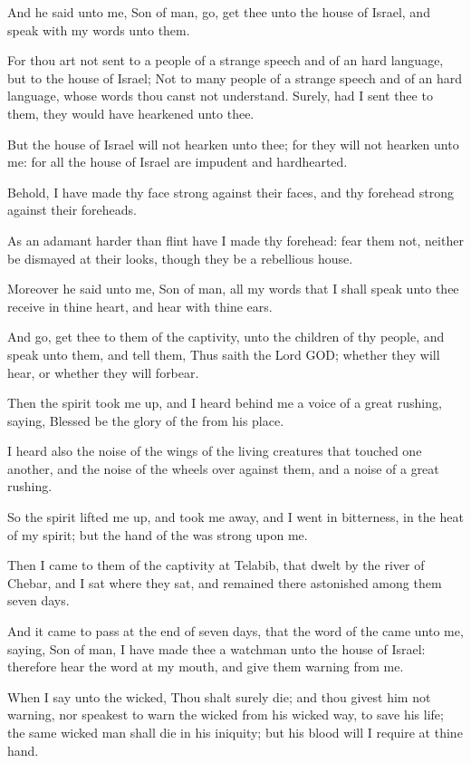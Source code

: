 \Verse And he said unto me, Son of man, go, get thee unto the house of Israel, and speak with my words unto them.

\Verse For thou art not sent to a people of a strange speech and of an hard language, but to the house of Israel; \Verse Not to many people of a strange speech and of an hard language, whose words thou canst not understand. Surely, had I sent thee to them, they would have hearkened unto thee.

\Verse But the house of Israel will not hearken unto thee; for they will not hearken unto me: for all the house of Israel are impudent and hardhearted.

\Verse Behold, I have made thy face strong against their faces, and thy forehead strong against their foreheads.

\Verse As an adamant harder than flint have I made thy forehead: fear them not, neither be dismayed at their looks, though they be a rebellious house.

\Verse Moreover he said unto me, Son of man, all my words that I shall speak unto thee receive in thine heart, and hear with thine ears.

\Verse And go, get thee to them of the captivity, unto the children of thy people, and speak unto them, and tell them, Thus saith the Lord GOD; whether they will hear, or whether they will forbear.

\Verse Then the spirit took me up, and I heard behind me a voice of a great rushing, saying, Blessed be the glory of the \LORD from his place.

\Verse I heard also the noise of the wings of the living creatures that touched one another, and the noise of the wheels over against them, and a noise of a great rushing.

\Verse So the spirit lifted me up, and took me away, and I went in bitterness, in the heat of my spirit; but the hand of the \LORD was strong upon me.

\Verse Then I came to them of the captivity at Telabib, that dwelt by the river of Chebar, and I sat where they sat, and remained there astonished among them seven days.

\Verse And it came to pass at the end of seven days, that the word of the \LORD came unto me, saying, \Verse Son of man, I have made thee a watchman unto the house of Israel: therefore hear the word at my mouth, and give them warning from me.

\Verse When I say unto the wicked, Thou shalt surely die; and thou givest him not warning, nor speakest to warn the wicked from his wicked way, to save his life; the same wicked man shall die in his iniquity; but his blood will I require at thine hand.

